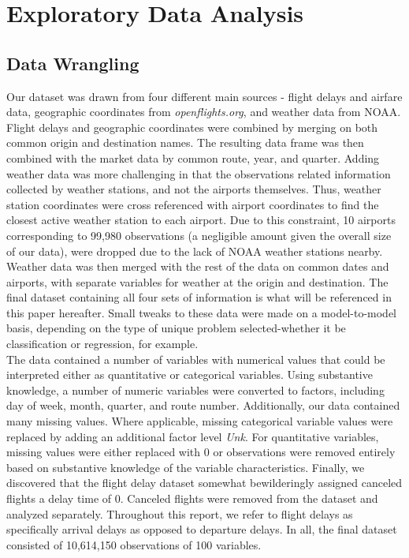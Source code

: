 \documentclass[12pt, a4paper, openany]{book}
\newcommand\tab[1][1cm]{\hspace*{#1}}
\begin{document}
\chapter{Exploratory Data Analysis}
	\section{Data Wrangling}
	\tab Our dataset was drawn from four different main sources - flight delays and airfare data, geographic coordinates from \textit{openflights.org}, and weather data from NOAA. Flight delays and geographic coordinates were combined by merging on both common origin and destination names. The resulting data frame was then combined with the market data by common route, year, and quarter. Adding weather data was more challenging in that the observations related information collected by weather stations, and not the airports themselves. Thus, weather station coordinates were cross referenced with airport coordinates to find the closest active weather station to each airport. Due to this constraint, 10 airports corresponding to 99,980 observations (a negligible amount given the overall size of our data), were dropped due to the lack of NOAA weather stations nearby. Weather data was then merged with the rest of the data on common dates and airports, with separate variables for weather at the origin and destination. The final dataset containing all four sets of information is what will be referenced in this paper hereafter. Small tweaks to these data were made on a model-to-model basis, depending on the type of unique problem selected-whether it be classification or regression, for example. \\
	\tab The data contained a number of variables with numerical values that could be interpreted either as quantitative or categorical variables. Using substantive knowledge, a number of numeric variables were converted to factors, including day of week, month, quarter, and route number. Additionally, our data contained many missing values. Where applicable, missing categorical variable values were replaced by adding an additional factor level \textit{Unk}. For quantitative variables, missing values were either replaced with 0 or observations were removed entirely based on substantive knowledge of the variable characteristics. Finally, we discovered that the flight delay dataset somewhat bewilderingly assigned canceled flights a delay time of 0. Canceled flights were removed from the dataset and analyzed separately. Throughout this report, we refer to flight delays as specifically arrival delays as opposed to departure delays. In all, the final dataset consisted of 10,614,150 observations of 100 variables. 
\end{document}
